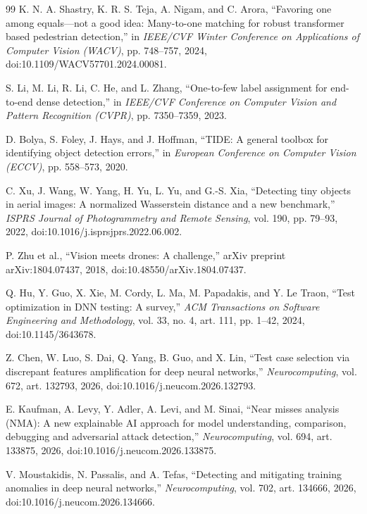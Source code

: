 \begin{thebibliography}{99}
K. N. A. Shastry, K. R. S. Teja, A. Nigam, and C. Arora,
``Favoring one among equals---not a good idea: Many-to-one matching for robust transformer based pedestrian detection,''
in \emph{IEEE/CVF Winter Conference on Applications of Computer Vision (WACV)},
pp. 748--757, 2024, doi:10.1109/WACV57701.2024.00081.

S. Li, M. Li, R. Li, C. He, and L. Zhang,
``One-to-few label assignment for end-to-end dense detection,''
in \emph{IEEE/CVF Conference on Computer Vision and Pattern Recognition (CVPR)},
pp. 7350--7359, 2023.

D. Bolya, S. Foley, J. Hays, and J. Hoffman,
``TIDE: A general toolbox for identifying object detection errors,''
in \emph{European Conference on Computer Vision (ECCV)},
pp. 558--573, 2020.

C. Xu, J. Wang, W. Yang, H. Yu, L. Yu, and G.-S. Xia,
``Detecting tiny objects in aerial images: A normalized Wasserstein distance and a new benchmark,''
\emph{ISPRS Journal of Photogrammetry and Remote Sensing}, vol. 190, pp. 79--93, 2022,
doi:10.1016/j.isprsjprs.2022.06.002.

P. Zhu et al.,
``Vision meets drones: A challenge,''
arXiv preprint arXiv:1804.07437, 2018,
doi:10.48550/arXiv.1804.07437.

Q. Hu, Y. Guo, X. Xie, M. Cordy, L. Ma, M. Papadakis, and Y. Le Traon,
``Test optimization in DNN testing: A survey,''
\emph{ACM Transactions on Software Engineering and Methodology}, vol. 33, no. 4,
art. 111, pp. 1--42, 2024, doi:10.1145/3643678.

Z. Chen, W. Luo, S. Dai, Q. Yang, B. Guo, and X. Lin,
``Test case selection via discrepant features amplification for deep neural networks,''
\emph{Neurocomputing}, vol. 672, art. 132793, 2026,
doi:10.1016/j.neucom.2026.132793.

E. Kaufman, A. Levy, Y. Adler, A. Levi, and M. Sinai,
``Near misses analysis (NMA): A new explainable AI approach for model understanding, comparison, debugging and adversarial attack detection,''
\emph{Neurocomputing}, vol. 694, art. 133875, 2026,
doi:10.1016/j.neucom.2026.133875.

V. Moustakidis, N. Passalis, and A. Tefas,
``Detecting and mitigating training anomalies in deep neural networks,''
\emph{Neurocomputing}, vol. 702, art. 134666, 2026,
doi:10.1016/j.neucom.2026.134666.
\end{thebibliography}
